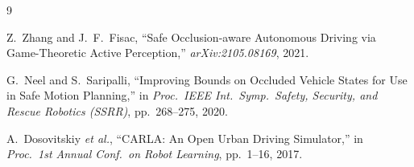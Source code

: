 \documentclass[11pt,a4paper]{article}
\begin{document}
\renewcommand{\refname}{\normalsize\bfseries REFERENCES%
  \vspace{-4pt}\\\rule{\linewidth}{0.4pt}\vspace{2pt}}
{\small
\begin{thebibliography}{9}
\setlength{\itemsep}{1pt}

Z.~Zhang and J.~F.~Fisac,
``Safe Occlusion-aware Autonomous Driving via Game-Theoretic Active Perception,''
\textit{arXiv:2105.08169}, 2021.

G.~Neel and S.~Saripalli,
``Improving Bounds on Occluded Vehicle States for Use in Safe Motion Planning,''
in \textit{Proc.\ IEEE Int.\ Symp.\ Safety, Security, and Rescue Robotics (SSRR)},
pp.\ 268--275, 2020.

A.~Dosovitskiy \textit{et al.},
``CARLA: An Open Urban Driving Simulator,''
in \textit{Proc.\ 1st Annual Conf.\ on Robot Learning}, pp.\ 1--16, 2017.

\end{thebibliography}
}
\end{document}
